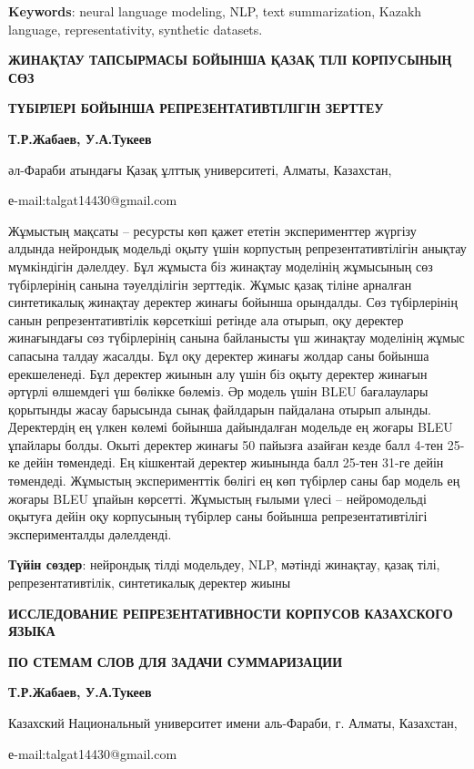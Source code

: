 \textbf{Keywords}: neural language modeling, NLP, text summarization,
Kazakh language, representativity, synthetic datasets.

\textbf{ЖИНАҚТАУ ТАПСЫРМАСЫ БОЙЫНША ҚАЗАҚ ТІЛІ КОРПУСЫНЫҢ СӨЗ}

\textbf{ТҮБІРЛЕРІ БОЙЫНША РЕПРЕЗЕНТАТИВТІЛІГІН ЗЕРТТЕУ}

\textbf{Т.Р.Жабаев, У.А.Тукеев}

әл-Фараби атындағы Қазақ ұлттық университеті, Алматы, Казахстан,

е-mail:talgat14430@gmail.com

Жұмыстың мақсаты -- ресурсты көп қажет ететін эксперименттер жүргізу
алдында нейрондық модельді оқыту үшін корпустың репрезентативтілігін
анықтау мүмкіндігін дәлелдеу. Бұл жұмыста біз жинақтау моделінің
жұмысының сөз түбірлерінің санына тәуелділігін зерттедік. Жұмыс қазақ
тіліне арналған синтетикалық жинақтау деректер жинағы бойынша орындалды.
Сөз түбірлерінің санын репрезентативтілік көрсеткіші ретінде ала отырып,
оқу деректер жинағындағы сөз түбірлерінің санына байланысты үш жинақтау
моделінің жұмыс сапасына талдау жасалды. Бұл оқу деректер жинағы жолдар
саны бойынша ерекшеленеді. Бұл деректер жиынын алу үшін біз оқыту
деректер жинағын әртүрлі өлшемдегі үш бөлікке бөлеміз. Әр модель үшін
BLEU бағалаулары қорытынды жасау барысында сынақ файлдарын пайдалана
отырып алынды. Деректердің ең үлкен көлемі бойынша дайындалған модельде
ең жоғары BLEU ұпайлары болды. Окыті деректер жинағы 50 пайызға азайған
кезде балл 4-тен 25-ке дейін төмендеді. Ең кішкентай деректер жиынында
балл 25-тен 31-ге дейін төмендеді. Жұмыстың эксперименттік бөлігі ең көп
түбірлер саны бар модель ең жоғары BLEU ұпайын көрсетті. Жұмыстың ғылыми
үлесі -- нейромодельді оқытуға дейін оқу корпусының түбірлер саны
бойынша репрезентативтілігі эксперименталды дәлелденді.

\textbf{Түйін сөздер}: нейрондық тілді модельдеу, NLP, мәтінді жинақтау,
қазақ тілі, репрезентативтілік, синтетикалық деректер жиыны

\textbf{ИССЛЕДОВАНИЕ РЕПРЕЗЕНТАТИВНОСТИ КОРПУСОВ КАЗАХСКОГО ЯЗЫКА}

\textbf{ПО СТЕМАМ СЛОВ ДЛЯ ЗАДАЧИ СУММАРИЗАЦИИ}

\textbf{Т.Р.Жабаев, У.А.Тукеев}

Казахский Национальный университет имени аль-Фараби, г. Алматы,
Казахстан,

е-mail:talgat14430@gmail.com

